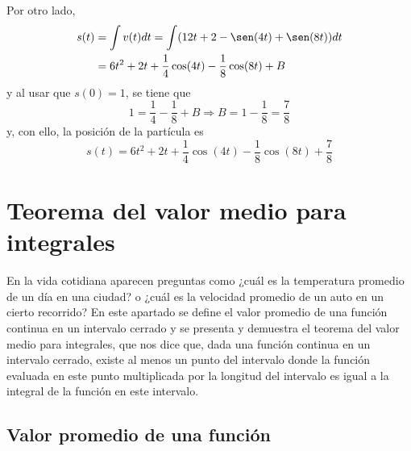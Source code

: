 Por otro lado,
\begin{align*}
s(t)&=\int v(t)dt=\int (12t+2-\sen (4t)+\sen (8t))dt\\
&=6t^2+2t+\frac{1}{4}\cos(4t)-\frac{1}{8}\cos(8t)+B
\end{align*}
y al usar que $s(0)=1$, se tiene que
\[
1=\frac{1}{4}-\frac{1}{8}+B \Rightarrow B=1-\frac{1}{8}=\frac{7}{8}
\]
y, con ello, la posición de la partícula es
\[
s(t)=6t^{2}+2t+\frac{1}{4}\cos (4t)-\frac{1}{8}\cos (8t)+\frac{7}{8} 
\]

\section{Teorema del valor medio para integrales}
En la vida cotidiana aparecen preguntas como ¿cuál es la temperatura promedio de un día en una ciudad? o ¿cuál es la velocidad promedio de un auto en un cierto recorrido? En este apartado se define el valor promedio de una función continua en un intervalo cerrado y se presenta y demuestra el teorema del valor medio para integrales, que nos dice que, dada una función continua en un intervalo cerrado, existe al menos un punto del intervalo donde la función evaluada en este punto multiplicada por la longitud del intervalo es igual a la integral de la función en este intervalo.

\subsection*{Valor promedio de una función}

